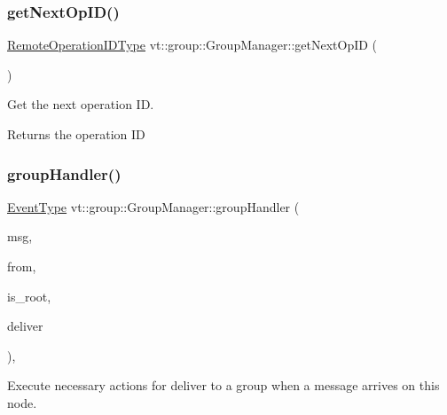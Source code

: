 \subsubsection{\texorpdfstring{get\+Next\+Op\+I\+D()}{getNextOpID()}}
{\footnotesize\ttfamily \hyperlink{namespacevt_1_1group_a73f2624ddeb535b39a08b6524f26b244}{Remote\+Operation\+I\+D\+Type} vt\+::group\+::\+Group\+Manager\+::get\+Next\+Op\+ID (\begin{DoxyParamCaption}{ }\end{DoxyParamCaption})}



Get the next operation ID. 

\begin{DoxyReturn}{Returns}
the operation ID 
\end{DoxyReturn}
\mbox{\label{structvt_1_1group_1_1_group_manager_a586641c48722f3288339a91be37781bd}} 
\subsubsection{\texorpdfstring{group\+Handler()}{groupHandler()}}
{\footnotesize\ttfamily \hyperlink{namespacevt_a009267401def7ae8bf201892222d060f}{Event\+Type} vt\+::group\+::\+Group\+Manager\+::group\+Handler (\begin{DoxyParamCaption}\item[{\hyperlink{namespacevt_ab2b3d506ec8e8d1540aede826d84a239}{Msg\+Shared\+Ptr}$<$ \hyperlink{namespacevt_a44d0d4e144748f2b19a1cfd962f50338}{Base\+Msg\+Type} $>$ const \&}]{msg,  }\item[{\hyperlink{namespacevt_a866da9d0efc19c0a1ce79e9e492f47e2}{Node\+Type} const}]{from,  }\item[{bool const}]{is\+\_\+root,  }\item[{bool $\ast$const}]{deliver }\end{DoxyParamCaption})\hspace{0.3cm}{\ttfamily [static]}, {\ttfamily [private]}}



Execute necessary actions for deliver to a group when a message arrives on this node. 


